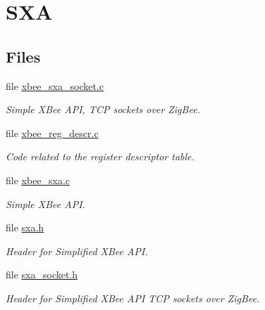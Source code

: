 \hypertarget{group___s_x_a}{\section{S\-X\-A}
\label{group___s_x_a}
}
\subsection*{Files}
\begin{DoxyCompactItemize}
\item 
file \hyperlink{xbee__sxa__socket_8c}{xbee\-\_\-sxa\-\_\-socket.\-c}
\begin{DoxyCompactList}\small\item\em Simple X\-Bee A\-P\-I, T\-C\-P sockets over Zig\-Bee. \end{DoxyCompactList}\item 
file \hyperlink{xbee__reg__descr_8c}{xbee\-\_\-reg\-\_\-descr.\-c}
\begin{DoxyCompactList}\small\item\em Code related to the register descriptor table. \end{DoxyCompactList}\item 
file \hyperlink{xbee__sxa_8c}{xbee\-\_\-sxa.\-c}
\begin{DoxyCompactList}\small\item\em Simple X\-Bee A\-P\-I. \end{DoxyCompactList}\item 
file \hyperlink{sxa_8h}{sxa.\-h}
\begin{DoxyCompactList}\small\item\em Header for Simplified X\-Bee A\-P\-I. \end{DoxyCompactList}\item 
file \hyperlink{sxa__socket_8h}{sxa\-\_\-socket.\-h}
\begin{DoxyCompactList}\small\item\em Header for Simplified X\-Bee A\-P\-I T\-C\-P sockets over Zig\-Bee. \end{DoxyCompactList}\end{DoxyCompactItemize}

